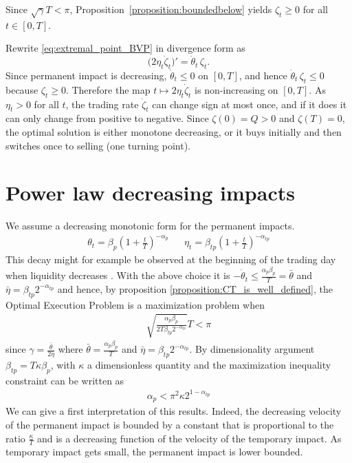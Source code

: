 \documentclass[final,3p,authoryear,12pt]{elsarticle}
\begin{document}
Since $\sqrt{\gamma}T<\pi$, Proposition~\ref{proposition:boundedbelow} yields
$\zeta_t\ge 0$ for all $t\in[0,T]$.

Rewrite \eqref{eq:extremal_point_BVP} in divergence form as
\[
\bigl(2\eta_t\dot\zeta_t\bigr)'=\dot\theta_t\,\zeta_t.
\]
Since permanent impact is decreasing, $\dot\theta_t\le 0$ on $[0,T]$, and hence
$\dot\theta_t\,\zeta_t\le 0$ because $\zeta_t\ge 0$. Therefore the map
$t\mapsto 2\eta_t\dot\zeta_t$ is non-increasing on $[0,T]$. As $\eta_t>0$ for
all $t$, the trading rate $\dot\zeta_t$ can change sign at most once, and if it
does it can only change from positive to negative. Since $\zeta(0)=Q>0$ and
$\zeta(T)=0$, the optimal solution is either monotone decreasing, or it buys
initially and then switches once to selling (one turning point).

\section{Power law decreasing impacts}\label{app:powerlaw}

We assume a decreasing monotonic form for the permanent impacts. 
\begin{align}
    \theta_{t} = \beta_{p}\left(1+\frac{t}{T}\right)^{-\alpha_{p}} && \eta_{t} = \beta_{tp}\left(1+\frac{t}{T}\right)^{-\alpha_{tp}}
\end{align}
This decay might for example be observed at the beginning of the trading day when liquidity decreases \cite{cartea2016incorporating}.
With the above choice it is $-\dot \theta_{t} \le \frac{\alpha_{p}\beta_{p}}{T}=\bar \theta$ and %
$\bar \eta=\beta_{tp}2^{-\alpha_{tp}}$
and hence, by proposition \ref{proposition:CT_is_well_defined}, the Optimal Execution Problem is a maximization problem when 
\begin{eqnarray}
    \sqrt{\frac{\alpha_{p}\beta_{p}}{2T\beta_{tp}2^{-\alpha_{tp}}}}T < \pi
\end{eqnarray}
since $\gamma = \frac{\bar{\theta}}{2\bar{\eta}}$ where $\bar{\theta} = \frac{\alpha_{p}\beta_{p}}{T}$ and $\bar{\eta}=\beta_{tp}2^{-\alpha_{tp}}$.
By dimensionality argument $\beta_{tp}=T\kappa\beta_{p}$, with $\kappa$ a dimensionless quantity%
and the maximization inequality constraint can be written as 
\begin{eqnarray}
\label{inequality:_PL_diff_impacts_maximization}
    \alpha_{p} < \pi^{2}\kappa2^{1-\alpha_{tp}}
\end{eqnarray}
We can give a first interpretation of this results. Indeed, the decreasing velocity of the permanent impact is bounded by a constant that is proportional to the ratio $\frac{\kappa}{T}$ and is a decreasing function of the velocity of the temporary impact. As temporary impact gets small, the permanent impact is lower bounded.
\end{document}
